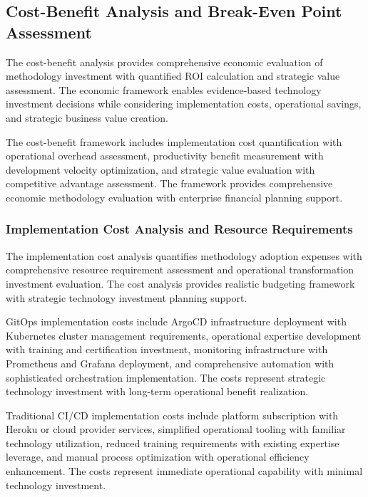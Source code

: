 
\subsection{Cost-Benefit Analysis and Break-Even Point Assessment}
\label{subsec:cost_benefit_analysis}

The cost-benefit analysis provides comprehensive economic evaluation of methodology investment with quantified ROI calculation and strategic value assessment. The economic framework enables evidence-based technology investment decisions while considering implementation costs, operational savings, and strategic business value creation.

The cost-benefit framework includes implementation cost quantification with operational overhead assessment, productivity benefit measurement with development velocity optimization, and strategic value evaluation with competitive advantage assessment. The framework provides comprehensive economic methodology evaluation with enterprise financial planning support.

\subsubsection{Implementation Cost Analysis and Resource Requirements}

The implementation cost analysis quantifies methodology adoption expenses with comprehensive resource requirement assessment and operational transformation investment evaluation. The cost analysis provides realistic budgeting framework with strategic technology investment planning support.

GitOps implementation costs include ArgoCD infrastructure deployment with Kubernetes cluster management requirements, operational expertise development with training and certification investment, monitoring infrastructure with Prometheus and Grafana deployment, and comprehensive automation with sophisticated orchestration implementation. The costs represent strategic technology investment with long-term operational benefit realization.

Traditional CI/CD implementation costs include platform subscription with Heroku or cloud provider services, simplified operational tooling with familiar technology utilization, reduced training requirements with existing expertise leverage, and manual process optimization with operational efficiency enhancement. The costs represent immediate operational capability with minimal technology investment.

